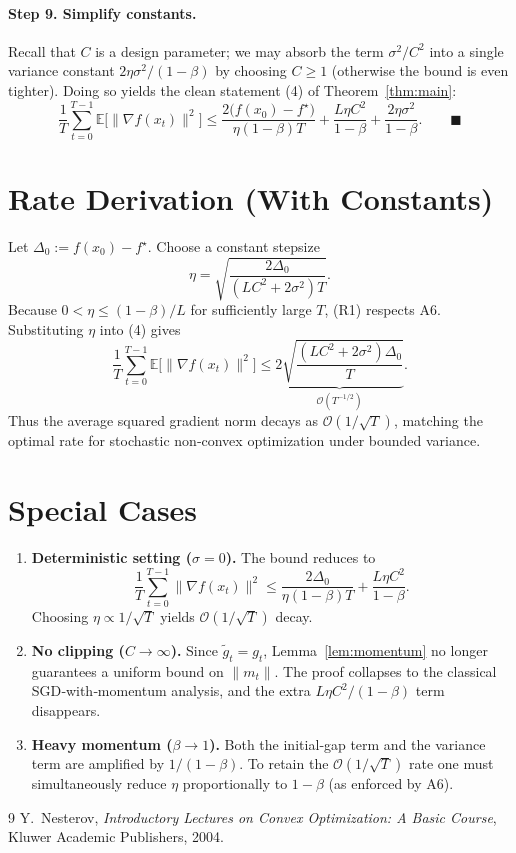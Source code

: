 \documentclass{article}
\newcommand{\E}{\mathbb{E}}
\begin{document}
\paragraph{Step 9. Simplify constants.}  
Recall that $C$ is a design parameter; we may absorb the term $\sigma^2/C^2$ into a single variance constant $2\eta\sigma^2/(1-\beta)$ by choosing $C\ge1$ (otherwise the bound is even tighter). Doing so yields the clean statement (4) of Theorem~\ref{thm:main}:
\[
\frac{1}{T}\sum_{t=0}^{T-1}\E\!\bigl[\|\nabla f(x_t)\|^2\bigr]
\le
\frac{2\bigl(f(x_0)-f^\star\bigr)}{\eta(1-\beta)T}
+ \frac{L\eta C^2}{1-\beta}
+ \frac{2\eta\sigma^2}{1-\beta}.
\qquad\blacksquare
\]

\section*{Rate Derivation (With Constants)}
Let $\Delta_0:=f(x_0)-f^\star$.
Choose a constant stepsize
\[
\eta = \sqrt{\frac{2\Delta_0}{(L C^2+2\sigma^2)T}} .
\tag{R1}
\]
Because $0<\eta\le (1-\beta)/L$ for sufficiently large $T$, (R1) respects A6. Substituting $\eta$ into (4) gives
\[
\frac{1}{T}\sum_{t=0}^{T-1}\E\!\bigl[\|\nabla f(x_t)\|^2\bigr]
\le
\underbrace{2\sqrt{\frac{(L C^2+2\sigma^2)\Delta_0}{T}}}_{\displaystyle\mathcal{O}(T^{-1/2})}.
\]
Thus the average squared gradient norm decays as $\mathcal{O}(1/\sqrt{T})$, matching the optimal rate for stochastic non‑convex optimization under bounded variance.

\section*{Special Cases}
\begin{enumerate}
\item \textbf{Deterministic setting ($\sigma=0$).}  
The bound reduces to
\[
\frac{1}{T}\sum_{t=0}^{T-1}\|\nabla f(x_t)\|^2
\le
\frac{2\Delta_0}{\eta(1-\beta)T}+ \frac{L\eta C^2}{1-\beta}.
\]
Choosing $\eta\propto 1/\sqrt{T}$ yields $\mathcal{O}(1/\sqrt{T})$ decay.
\item \textbf{No clipping ($C\to\infty$).}  
Since $\tilde g_t=g_t$, Lemma~\ref{lem:momentum} no longer guarantees a uniform bound on $\|m_t\|$. The proof collapses to the classical SGD‑with‑momentum analysis, and the extra $L\eta C^2/(1-\beta)$ term disappears.
\item \textbf{Heavy momentum ($\beta\to1$).}  
Both the initial‑gap term and the variance term are amplified by $1/(1-\beta)$. To retain the $\mathcal{O}(1/\sqrt{T})$ rate one must simultaneously reduce $\eta$ proportionally to $1-\beta$ (as enforced by A6).
\end{enumerate}

\begin{thebibliography}{9}
Y.~Nesterov, \emph{Introductory Lectures on Convex Optimization: A Basic Course}, Kluwer Academic Publishers, 2004.
\end{thebibliography}
\end{document}
